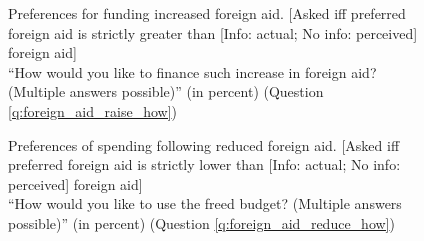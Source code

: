 \begin{figure}[h!]
    \caption[Preferences for funding increased foreign aid]{Preferences for funding increased foreign aid. [Asked iff preferred foreign aid is strictly greater than [Info: actual; No info: perceived] foreign aid] \\ ``How would you like to finance such increase in foreign aid? (Multiple answers possible)'' (in percent) (Question \ref{q:foreign_aid_raise_how})}\label{fig:foreign_aid_raise_how}
\end{figure}

\begin{figure}[h!]
    \caption[Preferences of spending following reduced foreign aid]{Preferences of spending following reduced foreign aid. [Asked iff preferred foreign aid is strictly lower than [Info: actual; No info: perceived] foreign aid] \\ ``How would you like to use the freed budget? (Multiple answers possible)'' (in percent) (Question \ref{q:foreign_aid_reduce_how})}\label{fig:foreign_aid_reduce_how}
\end{figure}

